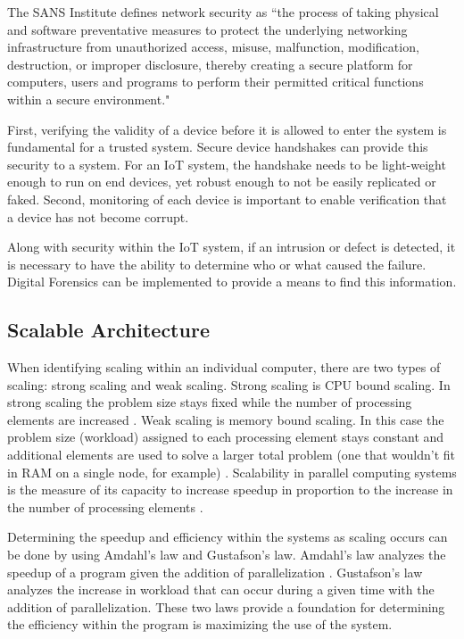 \documentclass[../main.tex]{subfiles}
\begin{document}
The SANS Institute defines network security as “the process of taking physical and software preventative measures to protect the underlying networking infrastructure from unauthorized access, misuse, malfunction, modification, destruction, or improper disclosure, thereby creating a secure platform for computers, users and programs to perform their permitted critical functions within a secure environment." \cite{network_sans}

First, verifying the validity of a device before it is allowed to enter the system is fundamental for a trusted system. Secure device handshakes can provide this security to a system. For an IoT system, the handshake needs to be light-weight enough to run on end devices, yet robust enough to not be easily replicated or faked. Second, monitoring of each device is important to enable verification that a device has not become corrupt.

Along with security within the IoT system, if an intrusion or defect is detected, it is necessary to have the ability to determine who or what caused the failure. Digital Forensics can be implemented to provide a means to find this information. 

\subsection{Scalable Architecture}

When identifying scaling within an individual computer, there are two types of scaling: strong scaling and weak scaling. Strong scaling is CPU bound scaling. In strong scaling the problem size stays fixed while the number of processing elements are increased \cite{scaling}. Weak scaling is memory bound scaling. In this case the problem size (workload) assigned to each processing element stays constant and additional elements are used to solve a larger total problem (one that wouldn't fit in RAM on a single node, for example) \cite{scaling}. Scalability in parallel computing systems is the measure of its capacity to increase speedup in proportion to the increase in the number of processing elements \cite{parallel_computing}. 

Determining the speedup and efficiency within the systems as scaling occurs can be done by using Amdahl's law and Gustafson's law. Amdahl's law analyzes the speedup of a program given the addition of parallelization \cite{dr-dobbs}. Gustafson's law analyzes the increase in workload that can occur during a given time with the addition of parallelization. These two laws provide a foundation for determining the efficiency within the program is maximizing the use of the system. 
\end{document}
